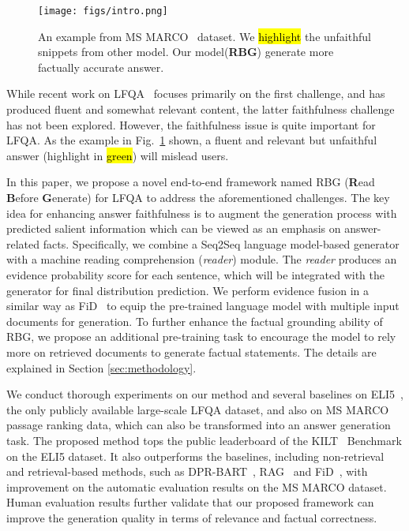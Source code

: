 \documentclass[11pt]{article}
\DeclareRobustCommand{\hlgreen}[1]{{\sethlcolor{soulgreen}\hl{#1}}}
\begin{document}
\begin{figure}[!t]
 \centering
 \vspace{-5pt}
 \texttt{[image: figs/intro.png]}
 \vspace{-10pt}
  \caption{An example from MS MARCO~\cite{nguyen2016ms} dataset. We \hlgreen{highlight} the unfaithful snippets from other model. Our model(\textbf{RBG}) generate more factually accurate answer. }
  \label{fig:example}
  \vspace{-10pt}
\end{figure}









While recent work on LFQA~\cite{krishna2021hurdles} focuses primarily on the first challenge, and has produced fluent and somewhat relevant content, the latter faithfulness challenge has not been explored. However, the faithfulness issue is quite important for LFQA. As the example in Fig.~\ref{fig:example} shown, a fluent and relevant but unfaithful answer (highlight in \hlgreen{green}) will mislead users.



In this paper, we propose a novel end-to-end framework named RBG (\textbf{R}ead \textbf{B}efore \textbf{G}enerate) for LFQA to address the aforementioned challenges. The key idea for enhancing answer faithfulness is to augment the generation process with predicted salient information which can be viewed as an emphasis on answer-related facts. Specifically, we combine a Seq2Seq language model-based generator with a machine reading comprehension (\textit{reader}) module. The \textit{reader} produces an evidence probability score for each sentence, which will be integrated with the generator for final distribution prediction. We perform evidence fusion in a similar way as FiD~\cite{izacard2021leveraging} to equip the pre-trained language model with multiple input documents for generation. To further enhance the factual grounding ability of RBG, we propose an additional pre-training task to encourage the model to rely more on retrieved documents to generate factual statements. The details are explained in Section \ref{sec:methodology}.


We conduct thorough experiments on our method and several baselines on  ELI5~\cite{fan2019eli5}, the only publicly available large-scale LFQA dataset, and also on MS MARCO~\cite{nguyen2016ms} passage ranking data, which can also be transformed into an answer generation task. The proposed method tops the public leaderboard of the KILT~\cite{petroni2021kilt} Benchmark on the ELI5 dataset. It also outperforms the baselines, including non-retrieval and retrieval-based methods, such as DPR-BART~\cite{petronicontext}, RAG~\cite{izacard2021leveraging} and FiD~\cite{izacard2021leveraging}, with improvement on the automatic evaluation results on the MS MARCO dataset. Human evaluation results further validate that our proposed framework can improve the generation quality in terms of relevance and factual correctness. 
\end{document}
